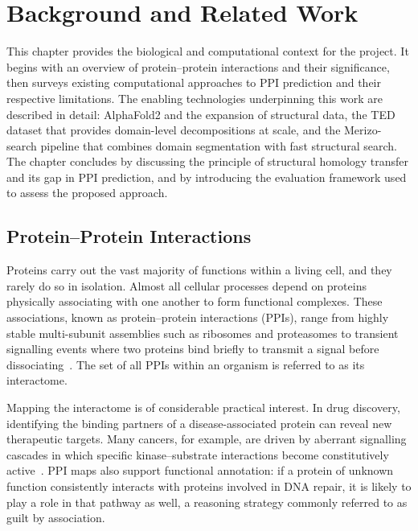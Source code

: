 \chapter{Background and Related Work}
\label{ch:background}

This chapter provides the biological and computational context for the project.
It begins with an overview of protein--protein interactions and their significance, then surveys existing computational approaches to PPI prediction and their respective limitations.
The enabling technologies underpinning this work are described in detail: AlphaFold2 and the expansion of structural data, the TED dataset that provides domain-level decompositions at scale, and the Merizo-search pipeline that combines domain segmentation with fast structural search.
The chapter concludes by discussing the principle of structural homology transfer and its gap in PPI prediction, and by introducing the evaluation framework used to assess the proposed approach.


\section{Protein--Protein Interactions}
\label{sec:bg-ppi}

Proteins carry out the vast majority of functions within a living cell, and they rarely do so in isolation.
Almost all cellular processes depend on proteins physically associating with one another to form functional complexes.
These associations, known as protein--protein interactions (PPIs), range from highly stable multi-subunit assemblies such as ribosomes and proteasomes to transient signalling events where two proteins bind briefly to transmit a signal before dissociating~\cite{zhang2025ppi}.
The set of all PPIs within an organism is referred to as its interactome.

Mapping the interactome is of considerable practical interest.
In drug discovery, identifying the binding partners of a disease-associated protein can reveal new therapeutic targets.
Many cancers, for example, are driven by aberrant signalling cascades in which specific kinase--substrate interactions become constitutively active~\cite{zhang2025ppi}.
PPI maps also support functional annotation: if a protein of unknown function consistently interacts with proteins involved in DNA repair, it is likely to play a role in that pathway as well, a reasoning strategy commonly referred to as guilt by association.

